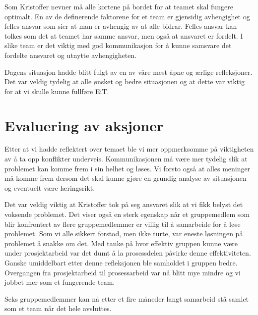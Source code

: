 Som Kristoffer nevner må alle kortene på bordet for at teamet skal fungere optimalt. En av de definerende faktorene
for et team er gjensidig avhengighet og felles ansvar \cite{Artikkel4} som sier at man er avhengig av at
alle bidrar. Felles ansvar kan tolkes som det at teamet har samme ansvar, men også at ansvaret er fordelt. I slike 
team er det viktig med god kommunikasjon for å kunne samsvare det fordelte ansvaret og utnytte avhengigheten.

Dagens situasjon hadde blitt fulgt av en av våre mest åpne og ærlige refleksjoner. Det var veldig tydelig at
alle ønsket og bedre situasjonen og at dette var viktig for at vi skulle kunne fullføre EiT. 

\section{Evaluering av aksjoner}

Etter at vi hadde reflektert over temaet ble vi mer oppmerksomme på viktigheten av å ta opp konflikter underveis.
Kommunikasjonen må være mer tydelig slik at problemet kan komme frem i sin helhet og løses. 
Vi forsto også at alles meninger må komme frem dersom det skal kunne gjøre en grundig analyse av situasjonen
og eventuelt være læringsrikt. 

Det var veldig viktig at Kristoffer tok på seg ansvaret slik at vi fikk belyst det voksende problemet.
Det viser også en sterk egenskap når et gruppemedlem som blir konfrontert av flere gruppemedlemmer er villig til 
å samarbeide for å løse problemet. 
Som vi alle sikkert forstod, men ikke turte, var eneste løsningen på problemet å snakke om det. 
Med tanke på hvor effektiv gruppen kunne være under prosjektarbeid var det dumt å la prosessdelen påvirke
denne effektiviteten. Ganske umiddelbart etter denne refleksjonen ble samholdet i gruppen bedre.
Overgangen fra prosjektarbeid til prosessarbeid var nå blitt mye mindre og vi jobbet mer som et fungerende team.

Seks gruppemedlemmer kan nå etter et fire måneder langt samarbeid stå samlet som et team når det hele avsluttes.